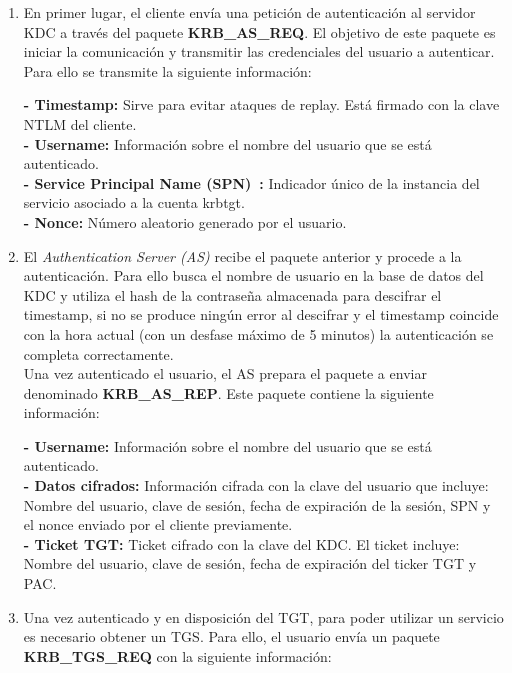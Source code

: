 \begin{enumerate}

\item En primer lugar, el cliente envía una petición de au\-ten\-ti\-ca\-ción al servidor KDC a través del paquete \textbf{KRB\_AS\_REQ}. El objetivo de este paquete es iniciar la comunicación y transmitir las credenciales del usuario a autenticar. Para ello se transmite la siguiente información:

\textbf{- Timestamp:} Sirve para evitar ataques de replay. Está firmado con la clave NTLM del cliente.\\
\textbf{- Username:} Información sobre el nombre del usuario que se está autenticado.\\
\textbf{- Service Principal Name (SPN)~\cite{Capitulo3:SPN}:} Indicador único de la instancia del servicio asociado a la cuenta krbtgt. \\
\textbf{- Nonce:} Número aleatorio generado por el usuario. \\

\item El {\it Authentication Server (AS)} recibe el paquete anterior y procede a la au\-ten\-ti\-ca\-ción. Para ello busca el nombre de usuario en la base de datos del KDC y utiliza el hash de la contraseña almacenada para descifrar el timestamp, si no se produce ningún error al descifrar y el timestamp coincide con la hora actual (con un desfase máximo de 5 minutos) la au\-ten\-ti\-ca\-ción se completa correctamente. \\

Una vez autenticado el usuario, el AS prepara el paquete a enviar denominado \textbf{KRB\_AS\_REP}. Este paquete contiene la siguiente información:

\textbf{- Username:} Información sobre el nombre del usuario que se está autenticado.\\
\textbf{- Datos cifrados:} Información cifrada con la clave del usuario que incluye: Nombre del usuario, clave de sesión, fecha de expiración de la sesión, SPN y el nonce enviado por el cliente previamente. \\
\textbf{- Ticket TGT:} Ticket cifrado con la clave del KDC. El ticket incluye: Nombre del usuario, clave de sesión, fecha de expiración del ticker TGT y PAC. \\

\item Una vez autenticado y en disposición del TGT, para poder utilizar un servicio es necesario obtener un TGS. Para ello, el usuario envía un paquete \textbf{KRB\_TGS\_REQ} con la siguiente información:


\end{enumerate}
